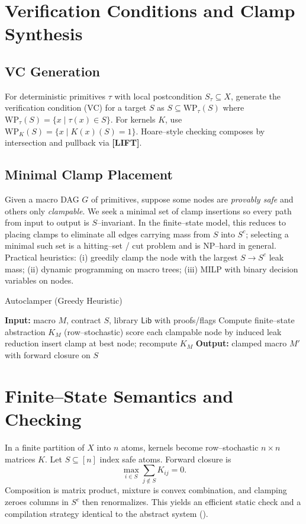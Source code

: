 \documentclass[11pt]{article}
\theoremstyle{definition}
\theoremstyle{plain}
\theoremstyle{remark}
\newcommand{\X}{X}
\newcommand{\1}{\mathbf{1}}
\begin{document}
\section{Verification Conditions and Clamp Synthesis}
\subsection{VC Generation}
For deterministic primitives $\tau$ with local postcondition $S_\tau\subseteq \X$, generate the verification condition (VC) for a target $S$ as $S\subseteq \mathrm{WP}_\tau(S)$ where $\mathrm{WP}_\tau(S)=\{x\mid \tau(x)\in S\}$. For kernels $K$, use $\mathrm{WP}_K(S)=\{x\mid K(x)(S)=1\}$. Hoare--style checking composes by intersection and pullback via \textbf{[LIFT]}.

\subsection{Minimal Clamp Placement}
Given a macro DAG $G$ of primitives, suppose some nodes are \emph{provably safe} and others only \emph{clampable}. We seek a minimal set of clamp insertions so every path from input to output is $S$--invariant. In the finite--state model, this reduces to placing clamps to eliminate all edges carrying mass from $S$ into $S^c$; selecting a minimal such set is a hitting--set / cut problem and is NP--hard in general. Practical heuristics: (i) greedily clamp the node with the largest $S\to S^c$ leak mass; (ii) dynamic programming on macro trees; (iii) MILP with binary decision variables on nodes.

\begin{algorithm}[H]
\caption{Autoclamper (Greedy Heuristic)}
\begin{algorithmic}[1]
\State \textbf{Input:} macro $M$, contract $S$, library $\mathsf{Lib}$ with proofs/flags
\State Compute finite--state abstraction $K_M$ (row--stochastic)
    \State score each clampable node by induced leak reduction
    \State insert clamp at best node; recompute $K_M$
\EndWhile
\State \textbf{Output:} clamped macro $M'$ with forward closure on $S$
\end{algorithmic}
\end{algorithm}

\section{Finite--State Semantics and Checking}
In a finite partition of $\X$ into $n$ atoms, kernels become row--stochastic $n\times n$ matrices $K$. Let $S\subseteq[n]$ index safe atoms. Forward closure is
\begin{equation}\label{eq:fwd}
\max_{i\in S} \sum_{j\notin S} K_{ij} = 0.
\end{equation}
Composition is matrix product, mixture is convex combination, and clamping zeroes columns in $S^c$ then renormalizes. This yields an efficient static check and a compilation strategy identical to the abstract system ().
\end{document}
